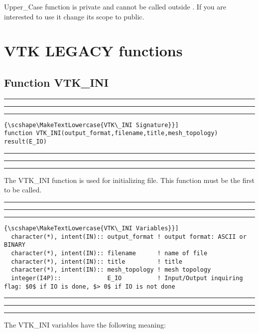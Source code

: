 \documentclass[pagesize=pdftex,fontsize=10pt,paper=a4,oneside]{scrbook}
\DeclareRobustCommand{\MarginNote}[1]{\marginpar{%
\slshape\footnotesize%
\parindent=0pt\lineskip=0pt\lineskiplimit=0pt%
\tolerance=2000\hyphenpenalty=300\exhyphenpenalty=300%
\doublehyphendemerits=100000\finalhyphendemerits=\doublehyphendemerits%
\raggedright\hspace{0pt}#1}}
\newenvironment{boxred}[1]%
               {%
                \noindent\hspace*{-0.025\textwidth}%
                \color{Maroon}%
                \rule[-5.8pt]{0.6pt}{6pt}\hspace*{-0.6pt}\rule{1.05\textwidth}{0.6pt}\hspace*{-0.6pt}\rule[-5.8pt]{0.6pt}{6pt}%
                \color{black}%
                \vspace*{0.6pt}\MarginNote{\color{Maroon}{#1}}%
               }%
               {%
                \noindent\hspace*{-0.025\textwidth}%
                \color{Maroon}%
                \rule[0pt]{0.6pt}{6pt}\hspace*{-0.6pt}\rule{1.05\textwidth}{0.6pt}\hspace*{-0.6pt}\rule[0pt]{0.6pt}{6pt}%
                \color{black}%
                \vspace*{2mm}%
               }
\DeclareRobustCommand{\MaiuscolettoBS}[1]{\textls[80]{\scshape\MakeTextLowercase{#1}}}
\begin{document}
Upper\_Case function is private and cannot be called outside \LIBVTKIO. If you are interested to use it change its scope
to public.

\chapter{VTK LEGACY functions}
\minitoc
\vspace*{8mm}

\section{Function VTK\_INI}
\label{fun:VTK_INI}
 
 
\begin{boxred}{}
\begin{lstlisting}[style=signature,title=\color{Maroon}\MaiuscolettoBS{VTK\_INI Signature}]
function VTK_INI(output_format,filename,title,mesh_topology) result(E_IO)
\end{lstlisting}
\end{boxred}
 
The VTK\_INI function is used for initializing file. This function must be the first to be called.


 
\begin{boxred}{}
\begin{lstlisting}[style=variables,title=\color{Maroon}\MaiuscolettoBS{VTK\_INI Variables}]
  character(*), intent(IN):: output_format ! output format: ASCII or BINARY
  character(*), intent(IN):: filename      ! name of file
  character(*), intent(IN):: title         ! title
  character(*), intent(IN):: mesh_topology ! mesh topology
  integer(I4P)::             E_IO          ! Input/Output inquiring flag: $0$ if IO is done, $> 0$ if IO is not done
\end{lstlisting}

\end{boxred}
 
The VTK\_INI variables have the following meaning:
\end{document}
